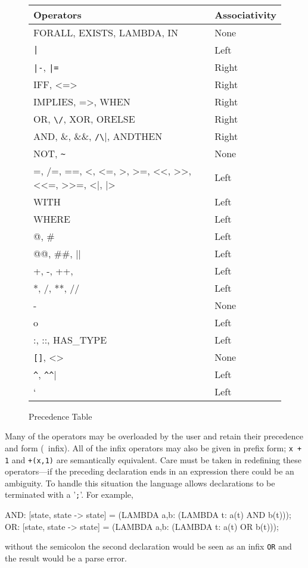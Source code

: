 \begin{figure}[htb]
\begin{center}{\small\tt
\begin{tabular}{|l|l|} \hline
{\rm Operators} & {\rm Associativity} \\ \hline
FORALL, EXISTS, LAMBDA, IN & None \\
\verb/|/ & Left \\
\verb/|-/, \verb/|=/ & Right \\
IFF, <=> & Right \\
IMPLIES, =>, WHEN & Right \\
OR, \verb|\/|, XOR, ORELSE & Right \\
AND, \&, \&\&, \verb|/\|, ANDTHEN & Right \\
NOT, \verb|~| & None \\
=, /=, ==, <, <=, >, >=, <<, >>, <<=, >>=, <|, |> & Left \\
WITH & Left \\
WHERE & Left \\
@, \# & Left \\
@@, \#\#, || & Left \\
+, -, ++, ~ & Left \\
*, /, **, // & Left \\
- & None \\
o & Left \\
:, ::, HAS\_TYPE & Left \\
\verb|[]|, <> & None \\
\verb|^|, \verb|^^| & Left \\
` & Left \\ \hline
\end{tabular}}
\end{center}\caption{Precedence Table}\label{precedenceops}
\end{figure}


Many of the operators may be overloaded by the user and retain their
precedence and form (\eg\ infix).  All of the infix operators may also be
given in prefix form; \texttt{x + 1} and \texttt{+(x,1)} are semantically equivalent.  Care must be taken in redefining these operators---if the
preceding declaration ends in an expression there could be an ambiguity.
To handle this situation the language allows declarations to be terminated
with a '\texttt{;}'.  For example,
\begin{pvsex}
  AND: [state, state -> state] = (LAMBDA a,b: (LAMBDA t: a(t) AND b(t)));
  OR: [state, state -> state] = (LAMBDA a,b: (LAMBDA t: a(t) OR b(t)));
\end{pvsex}
%
without the semicolon the second declaration would be seen as an infix
\texttt{OR} and the result would be a parse error.

